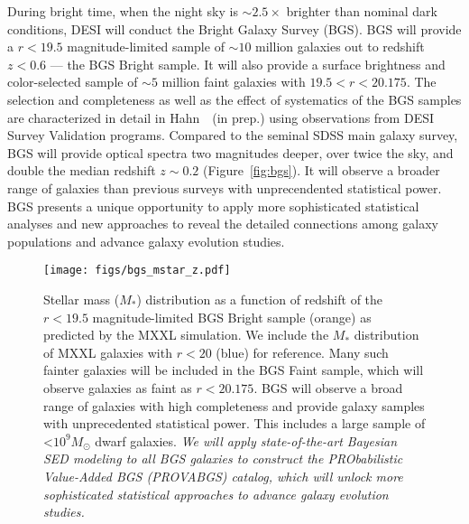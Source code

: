 During bright time, when the night sky is ${\sim}2.5\times$ brighter than
nominal dark conditions, DESI will conduct the Bright Galaxy Survey (BGS).
BGS will provide a $r < 19.5$ magnitude-limited sample of ${\sim}10$ million
galaxies out to redshift $z < 0.6$ --- the BGS Bright sample. 
It will also provide a surface brightness and color-selected sample of 
${\sim}5$ million faint galaxies with $19.5 < r < 20.175$. 
The selection and completeness as well as the effect of systematics of the BGS
samples are characterized in detail in Hahn~\etal~(in prep.) using observations
from DESI Survey Validation programs. 
Compared to the seminal SDSS main galaxy survey, BGS will provide optical
spectra two magnitudes deeper, over twice the sky, and double the median
redshift $z{\sim}0.2$ (Figure~\ref{fig:bgs}). 
It will observe a broader range of galaxies than previous surveys with
unprecendented statistical power. 
BGS presents a unique opportunity to apply more sophisticated statistical
analyses and new approaches to reveal the detailed connections among galaxy
populations and  advance galaxy evolution studies. 

\begin{figure}
\begin{center}
    \texttt{[image: figs/bgs\_mstar\_z.pdf]}
    \caption{
        Stellar mass ($M_*$) distribution as a function of redshift of the 
        $r < 19.5$ magnitude-limited BGS Bright sample (orange) as predicted by
        the MXXL simulation. 
        We include the $M_*$ distribution of MXXL galaxies with $r < 20$ (blue)
        for reference.
        Many such fainter galaxies will be included in the BGS Faint sample,
        which will observe galaxies as faint as $r < 20.175$. 
        BGS will observe a broad range of galaxies with high completeness and
        provide galaxy samples with unprecedented statistical power.
        This includes a large sample of <$10^9M_\odot$ dwarf galaxies. %
        \emph{We will apply state-of-the-art Bayesian SED modeling to all BGS
        galaxies to construct the PRObabilistic Value-Added BGS (PROVABGS)
        catalog, which will unlock more sophisticated statistical approaches to
        advance galaxy evolution studies.}}\label{fig:bgs_mstar}
\end{center}
\end{figure}

